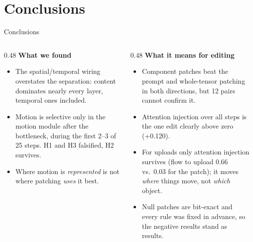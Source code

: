 \documentclass[aspectratio=169,11pt]{beamer}
\begin{document}
\section{Conclusions}
\begin{frame}{Conclusions}
  \begin{columns}[T,onlytextwidth]
    \begin{column}{0.48\textwidth}
      \small
      \textbf{What we found}
      \begin{itemize}\setlength{\itemsep}{1mm}
        \item The spatial/temporal wiring overstates the separation: content dominates nearly every
          layer, temporal ones included.
        \item Motion is selective only in the motion module after the bottleneck, during the first
          2--3 of 25 steps. H1 and H3 falsified, H2 survives.
        \item Where motion is \emph{represented} is not where patching \emph{uses} it best.
      \end{itemize}
    \end{column}
    \begin{column}{0.48\textwidth}
      \small
      \textbf{What it means for editing}
      \begin{itemize}\setlength{\itemsep}{1mm}
        \item Component patches beat the prompt and whole-tensor patching in both directions, but
          12 pairs cannot confirm it.
        \item Attention injection over all steps is the one edit clearly above zero (+0.120).
        \item For uploads only attention injection survives (flow to upload 0.66 vs.\ 0.03 for the
          patch); it moves \emph{where} things move, not \emph{which} object.
        \item Null patches are bit-exact and every rule was fixed in advance, so the negative
          results stand as results.
      \end{itemize}
    \end{column}
  \end{columns}
\end{frame}

\end{document}
